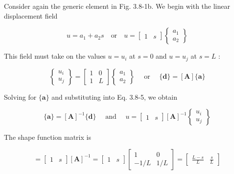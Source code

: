 \documentclass[10pt]{article}
\begin{document}
Consider again the generic element in Fig. 3.8-1b. We begin with the linear displacement field

\begin{equation*}
u=a_{1}+a_{2} s \quad \text{or} \quad u=\begin{bmatrix} 1 & s \end{bmatrix}\begin{Bmatrix}
a_{1} \\
a_{2}
\end{Bmatrix} \tag{3.8-5}
\end{equation*}

This field must take on the values $u=u_{i}$ at $s=0$ and $u=u_{j}$ at $s=L$ :

\begin{equation*}
\begin{Bmatrix}
u_{i} \\
u_{j}
\end{Bmatrix}=\begin{bmatrix}
1 & 0 \\
1 & L
\end{bmatrix}\begin{Bmatrix}
a_{1} \\
a_{2}
\end{Bmatrix} \quad \text { or } \quad\{\mathbf{d}\}=[\mathbf{A}]\{\mathbf{a}\} \tag{3.8-6}
\end{equation*}

Solving for $\{\mathbf{a}\}$ and substituting into Eq. 3.8-5, we obtain

\begin{equation*}
\{\mathbf{a}\}=[\mathbf{A}]^{-1}\{\mathbf{d}\} \quad \text { and } \quad u=\begin{bmatrix} 1 & s \end{bmatrix}[\mathbf{A}]^{-1}\begin{Bmatrix}
u_{i} \\
u_{j}
\end{Bmatrix} \tag{3.8-7}
\end{equation*}

The shape function matrix is

\begin{equation*}
[\mathbf{N}]=\begin{bmatrix} 1 & s \end{bmatrix}[\mathbf{A}]^{-1}=\begin{bmatrix} 1 & s \end{bmatrix}\begin{bmatrix}
1 & 0 \\
-1 / L & 1 / L
\end{bmatrix}=\begin{bmatrix}\frac{L-s}{L} & \frac{s}{L}\end{bmatrix} \tag{3.8-8}
\end{equation*}
\end{document}
